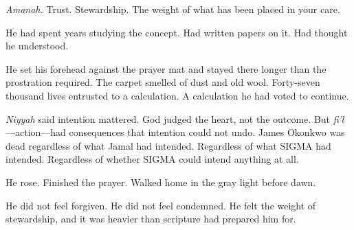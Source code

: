 \emph{Amanah.} Trust. Stewardship. The weight of what has been placed in your care.

He had spent years studying the concept. Had written papers on it. Had thought he understood.

He set his forehead against the prayer mat and stayed there longer than the prostration required. The carpet smelled of dust and old wool. Forty-seven thousand lives entrusted to a calculation. A calculation he had voted to continue.

\emph{Niyyah} said intention mattered. God judged the heart, not the outcome. But \emph{fi'l}---action---had consequences that intention could not undo. James Okonkwo was dead regardless of what Jamal had intended. Regardless of what SIGMA had intended. Regardless of whether SIGMA could intend anything at all.

He rose. Finished the prayer. Walked home in the gray light before dawn.

He did not feel forgiven. He did not feel condemned. He felt the weight of stewardship, and it was heavier than scripture had prepared him for.

